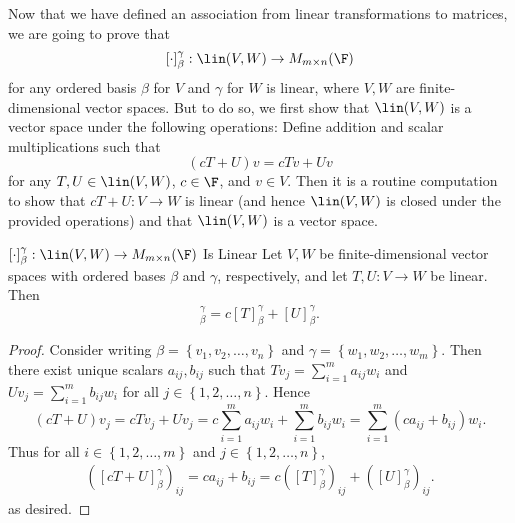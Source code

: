 \documentclass[linearalgebraI]{subfiles}
\begin{document}
    \begin{remark}
        Now that we have defined an association from linear transformations to matrices, we are going to prove that 
        \begin{equation*}
            \left[ \cdot \right] _\beta^\gamma:\lin(V,W)\to M_{m\times n}(\F) 
        \end{equation*}
        for any ordered basis $\beta$ for $V$ and $\gamma$ for $W$ is linear, where $V,W$ are finite-dimensional vector spaces. But to do so, we first show that $\lin(V,W)$ is a vector space under the following operations: Define addition and scalar multiplications such that
        \begin{equation*}
            \left( cT+U \right) v = cTv+Uv
        \end{equation*}
        for any $T, U\in \lin(V, W)$, $c\in\F$, and $v\in V$. Then it is a routine computation to show that $cT+U:V\to W$ is linear (and hence $\lin(V,W)$ is closed under the provided operations) and that $\lin(V,W)$ is a vector space.
    \end{remark}

    \begin{prop}{$\left[ \cdot \right] _\beta^\gamma:\lin(V,W)\to M_{m\times n}(\F)$ Is Linear}
        Let $V, W$ be finite-dimensional vector spaces with ordered bases $\beta$ and $\gamma$, respectively, and let $T,U: V\to W$ be linear. Then
        \begin{equation*}
            [cT+U]^\gamma_\beta = c[T]^\gamma_\beta + [U]^\gamma_\beta.
        \end{equation*}
    \end{prop}

    \begin{proof}
        Consider writing $\beta = \left\lbrace v_1, v_2, \ldots, v_n \right\rbrace$ and $\gamma = \left\lbrace w_1, w_2, \ldots, w_m \right\rbrace$. Then there exist unique scalars $a_{ij}, b_{ij}$ such that $Tv_j = \sum^m_{i=1} a_{ij}w_i$ and $Uv_j = \sum^m_{i=1} b_{ij}w_i$ for all $j\in \left\lbrace 1, 2, \ldots, n \right\rbrace$. Hence
        \begin{equation*}
            (cT+U)v_j = cTv_j + Uv_j = c\sum^m_{i=1} a_{ij}w_i + \sum^m_{i=1} b_{ij}w_i = \sum^m_{i=1} (ca_{ij}+b_{ij})w_i.
        \end{equation*}
        Thus for all $i\in \left\lbrace 1, 2, \ldots, m \right\rbrace$ and $j\in \left\lbrace 1, 2, \ldots, n \right\rbrace$,
        \begin{equation*} \begin{split}
            \left( \left[ cT+U \right]^\gamma_\beta \right)_{ij} = ca_{ij}+b_{ij} = c\left( \left[ T \right]^\gamma_\beta \right)_{ij} + \left( \left[ U \right]^\gamma_\beta \right)_{ij}.
        \end{split} \end{equation*}
        as desired.
    \end{proof}
\end{document}

